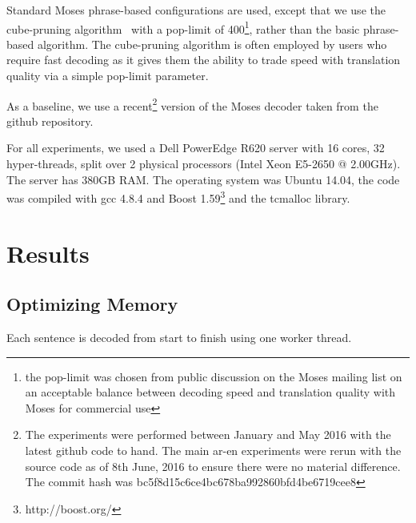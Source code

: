 \documentclass[]{article}
\begin{document}
Standard Moses phrase-based configurations are used, except that we use the cube-pruning algorithm~\citep{Chiang:2007:cl} with a pop-limit of 400\footnote{the pop-limit was chosen from public discussion on the Moses mailing list on an acceptable balance between decoding speed and translation quality with Moses for commercial use %
}, rather than the basic phrase-based algorithm. The cube-pruning algorithm is often employed by users who require fast decoding as it gives them the ability to trade speed with translation quality via a simple pop-limit parameter.

As a baseline, we use a recent\footnote{The experiments were performed between January and May 2016 with the latest github code to hand. The main ar-en experiments were rerun with the source code as of 8th June, 2016 to ensure there were no material difference. The commit hash was \scriptsize{bc5f8d15c6ce4bc678ba992860bfd4be6719cee8} } version of the Moses decoder taken from the github repository.

For all experiments, we used a Dell PowerEdge R620 server with 16 cores, 32 hyper-threads, split over 2 physical processors (Intel Xeon E5-2650 @ 2.00GHz). The server has 380GB RAM. The operating system was Ubuntu 14.04, the code was compiled with gcc 4.8.4 and Boost 1.59\footnote{http://boost.org/} and the tcmalloc library.

\section{Results}
\label{sec:Results}

\subsection{Optimizing Memory}

Each sentence is decoded from start to finish using one worker thread. %
\end{document}
